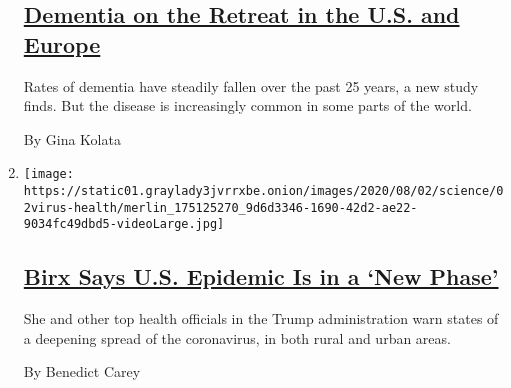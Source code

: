 \begin{enumerate}
{  \subsection{\texorpdfstring{\href{/2020/08/03/health/alzheimers-dementia-rates.html}{Dementia
  on the Retreat in the U.S. and
  Europe}}{Dementia on the Retreat in the U.S. and Europe}}\label{dementia-on-the-retreat-in-the-us-and-europe}}

  Rates of dementia have steadily fallen over the past 25 years, a new
  study finds. But the disease is increasingly common in some parts of
  the world.

  By Gina Kolata
\item
  \texttt{[image: https://static01.graylady3jvrrxbe.onion/images/2020/08/02/science/02virus-health/merlin\_175125270\_9d6d3346-1690-42d2-ae22-9034fc49dbd5-videoLarge.jpg]}

  \hypertarget{birx-says-us-epidemic-is-in-a-new-phase}{%
  \subsection{\texorpdfstring{\href{/2020/08/02/health/dr-birx-coronavirus-phase.html}{Birx
  Says U.S. Epidemic Is in a `New
  Phase'}}{Birx Says U.S. Epidemic Is in a `New Phase'}}\label{birx-says-us-epidemic-is-in-a-new-phase}}

  She and other top health officials in the Trump administration warn
  states of a deepening spread of the coronavirus, in both rural and
  urban areas.

  By Benedict Carey
\end{enumerate}

